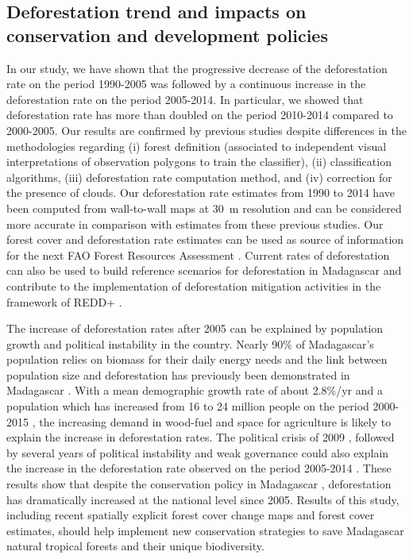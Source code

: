 \documentclass[a4paper, 12pt, leqno]{article}\usepackage[]{graphicx}\usepackage[]{color}
\begin{document}
\subsection{Deforestation trend and impacts on conservation and
  development policies}

In our study, we have shown that the progressive decrease of the
deforestation rate on the period 1990-2005 was followed by a
continuous increase in the deforestation rate on the period
2005-2014. In particular, we showed that deforestation rate has more
than doubled on the period 2010-2014 compared to 2000-2005. Our
results are confirmed by previous studies \citep{Harper2007, MEFT2009,
  ONE2015} despite differences in the methodologies regarding (i)
forest definition (associated to independent visual interpretations of
observation polygons to train the classifier), (ii) classification
algorithms, (iii) deforestation rate computation method, and (iv)
correction for the presence of clouds. Our deforestation rate
estimates from 1990 to 2014 have been computed from wall-to-wall maps
at 30~m resolution and can be considered more accurate in comparison
with estimates from these previous studies. Our forest cover and
deforestation rate estimates can be used as source of information for
the next FAO Forest Resources Assessment \citep{Keenan2015}. Current
rates of deforestation can also be used to build reference scenarios
for deforestation in Madagascar and contribute to the implementation
of deforestation mitigation activities in the framework of REDD+
\citep{Olander2008}.

The increase of deforestation rates after 2005 can be explained by
population growth and political instability in the country. Nearly
90\% of Madagascar's population relies on biomass for their daily
energy needs \citep{Minten2013} and the link between population size
and deforestation has previously been demonstrated in Madagascar
\citep{Vieilledent2013, Gorenflo2011}. With a mean demographic growth
rate of about 2.8\%/yr and a population which has increased from 16 to
24 million people on the period 2000-2015 \citep{UN2015}, the
increasing demand in wood-fuel and space for agriculture is likely to
explain the increase in deforestation rates. The political crisis of
2009 \citep{Ploch2012}, followed by several years of political
instability and weak governance could also explain the increase in the
deforestation rate observed on the period 2005-2014
\citep{Smith2003}. These results show that despite the conservation
policy in Madagascar \citep{Freudenberger2010}, deforestation has
dramatically increased at the national level since 2005. Results of
this study, including recent spatially explicit forest cover change
maps and forest cover estimates, should help implement new
conservation strategies to save Madagascar natural tropical forests
and their unique biodiversity.
\end{document}
